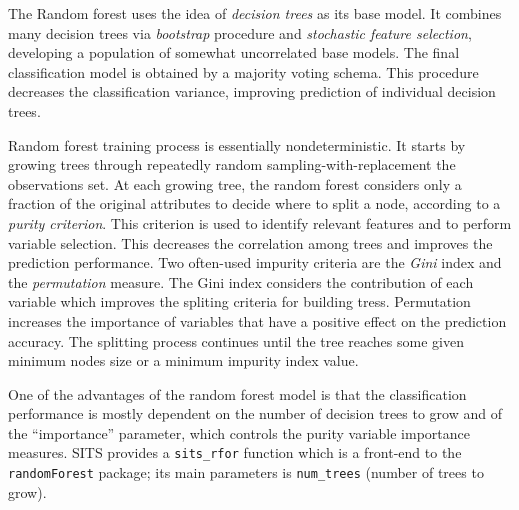 \documentclass[a4paper,]{tufte-book}
\begin{document}
The Random forest uses the idea of \emph{decision trees} as its base model. It combines many decision trees via \emph{bootstrap} procedure and \emph{stochastic feature selection}, developing a population of somewhat uncorrelated base models. The final classification model is obtained by a majority voting schema. This procedure decreases the classification variance, improving prediction of individual decision trees.

Random forest training process is essentially nondeterministic. It starts by growing trees through repeatedly random sampling-with-replacement the observations set. At each growing tree, the random forest considers only a fraction of the original attributes to decide where to split a node, according to a \emph{purity criterion}. This criterion is used to identify relevant features and to perform variable selection. This decreases the correlation among trees and improves the prediction performance. Two often-used impurity criteria are the \emph{Gini} index and the \emph{permutation} measure. The Gini index considers the contribution of each variable which improves the spliting criteria for building tress. Permutation increases the importance of variables that have a positive effect on the prediction accuracy. The splitting process continues until the tree reaches some given minimum nodes size or a minimum impurity index value.

One of the advantages of the random forest model is that the classification performance is mostly dependent on the number of decision trees to grow and of the ``importance'' parameter, which controls the purity variable importance measures. SITS provides a \texttt{sits\_rfor} function which is a front-end to the \texttt{randomForest} package\citep{Wright2017}; its main parameters is \texttt{num\_trees} (number of trees to grow).
\end{document}
